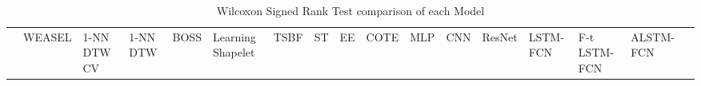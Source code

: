 \documentclass[article]{IEEEtran}
\begin{document}
\def\tabularxcolumn#1{m{#1}}

\newcommand{\heading}[1]{\multicolumn{1}{c}{#1}}

\begin{table*}[]
\centering
\caption{Wilcoxon Signed Rank Test comparison of each Model}
\label{tab:pvaltab}
\begin{adjustbox}{width=1 \textwidth}

\begin{tabularx}{1.27 \textwidth}{|b|s|s|s|s|s|s|s|s|s|s|s|s|s|s|s|s|}


    
    \hline
          & WEASEL & 1-NN DTW CV & 1-NN DTW & BOSS  & Learning Shapelet & TSBF  & ST    & EE    & COTE  & MLP   & CNN   & ResNet & LSTM-FCN & F-t LSTM-FCN & ALSTM-FCN\\
    


\end{tabularx}
\end{adjustbox}
\end{table*}
\end{document}
